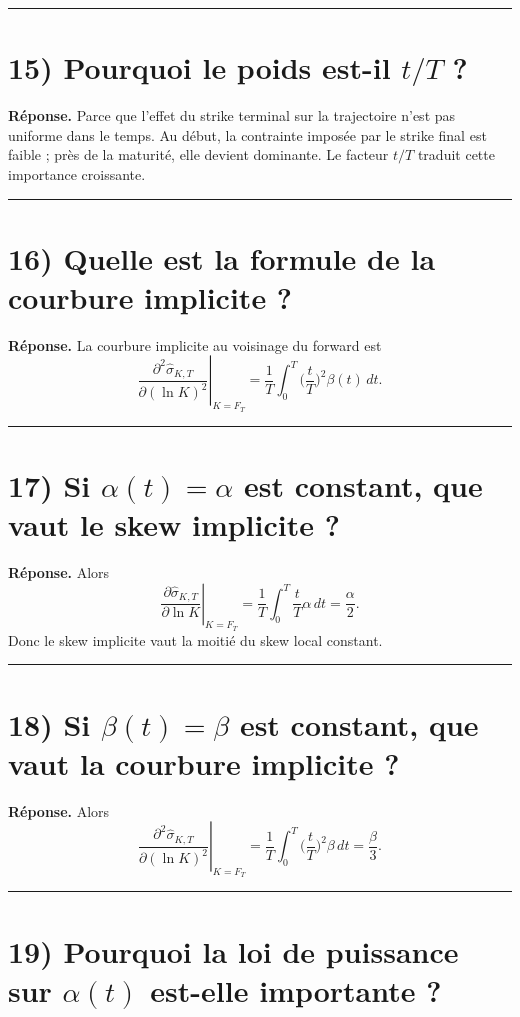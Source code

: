 \documentclass[11pt,a4paper]{article}
\begin{document}
\bigskip\hrule\bigskip

\section{15) Pourquoi le poids est-il \(t/T\) ?}

\textbf{Réponse.}  
Parce que l’effet du strike terminal sur la trajectoire n’est pas uniforme dans le temps.  
Au début, la contrainte imposée par le strike final est faible ; près de la maturité, elle devient dominante.  
Le facteur \(t/T\) traduit cette importance croissante.

\bigskip\hrule\bigskip

\section{16) Quelle est la formule de la courbure implicite ?}

\textbf{Réponse.}  
La courbure implicite au voisinage du forward est
\[
\left.\frac{\partial^2 \hat{\sigma}_{K,T}}{\partial (\ln K)^2}\right|_{K=F_T}
=
\frac{1}{T}\int_0^T \Big(\frac{t}{T}\Big)^2\beta(t)\,dt.
\]

\bigskip\hrule\bigskip

\section{17) Si \(\alpha(t)=\alpha\) est constant, que vaut le skew implicite ?}

\textbf{Réponse.}  
Alors
\[
\left.\frac{\partial \hat{\sigma}_{K,T}}{\partial \ln K}\right|_{K=F_T}
=
\frac{1}{T}\int_0^T \frac{t}{T}\alpha\,dt
=
\frac{\alpha}{2}.
\]
Donc le skew implicite vaut la moitié du skew local constant.

\bigskip\hrule\bigskip

\section{18) Si \(\beta(t)=\beta\) est constant, que vaut la courbure implicite ?}

\textbf{Réponse.}  
Alors
\[
\left.\frac{\partial^2 \hat{\sigma}_{K,T}}{\partial (\ln K)^2}\right|_{K=F_T}
=
\frac{1}{T}\int_0^T \Big(\frac{t}{T}\Big)^2\beta\,dt
=
\frac{\beta}{3}.
\]

\bigskip\hrule\bigskip

\section{19) Pourquoi la loi de puissance sur \(\alpha(t)\) est-elle importante ?}
\end{document}

